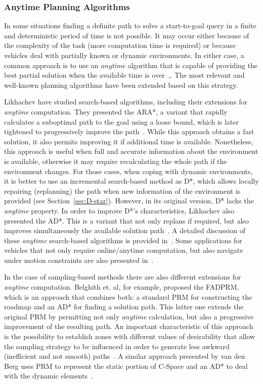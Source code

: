 \subsubsection{Anytime Planning Algorithms}

In some situations finding a definite path to solve a start-to-goal query in a
finite and deterministic period of time is not possible. It may occur either
because of the complexity of the task (\ie more computation time is required) or
because vehicles deal with partially known or dynamic environments. In either
case, a common approach is to use an \textit{anytime} algorithm that is capable
of providing the best partial solution when the available time is
over~\cite{Zilberstein1995},\cite{Dean1988}. The most relevant and well-known
planning algorithms have been extended based on this strategy.

Likhachev \etal have studied search-based algorithms, including their extensions
for \textit{anytime} computation. They presented the \ac{ARA*}, a variant that
rapidly calculates a suboptimal path to the goal using a loose bound, which is
later tightened to progressively improve the path~\cite{Likhachev2003}. While
this approach obtains a fast solution, it also permits improving it if
additional time is available. Nonetheless, this approach is useful when
full and accurate information about the environment is available, otherwise it
may require recalculating the whole path if the environment changes. For those
cases, \ie when coping with dynamic environments, it is better to use an
incremental search-based method as \ac{D*}, which allows locally repairing
(replanning) the path when new information of the environment is provided (see
Section~\ref{sec:D-star}). However, in its original version, \ac{D*} lacks the
\textit{anytime} property. In order to improve \ac{D*}'s characteristics,
Likhachev \etal also presented the \ac{AD*}. This is a variant that not only
replans if required, but also improves simultaneously the available solution
path~\cite{Likhachev2005}. A detailed discussion of these \textit{anytime}
search-based algorithms is provided in~\cite{Likhachev2008}.
Some applications for vehicles that not only require online/anytime computation,
but also navigate under motion constraints are also presented
in~\cite{Likhachev2009}.

In the case of sampling-based methods there are also different extensions for
\textit{anytime} computation. Belghith et. al, for example, proposed the
\ac{FADPRM}, which is an approach that combines both: a standard \ac{PRM} for
constructing the roadmap and an \ac{AD*} for finding a solution path. This
latter one extends the original \ac{PRM} by permitting not only \textit{anytime}
calculation, but also a progressive improvement of the resulting path. An
important characteristic of this approach is the possibility to establish zones
with different values of desirability that allow the sampling strategy to be
influenced in order to generate less awkward (inefficient and not smooth)
paths~\cite{Belghith2006}. A similar approach presented by van den Berg
\etal uses \ac{PRM} to represent the static portion of \ac{C-Space} and an
\ac{AD*} to deal with the dynamic elements~\cite{VandenBerg2006}.

